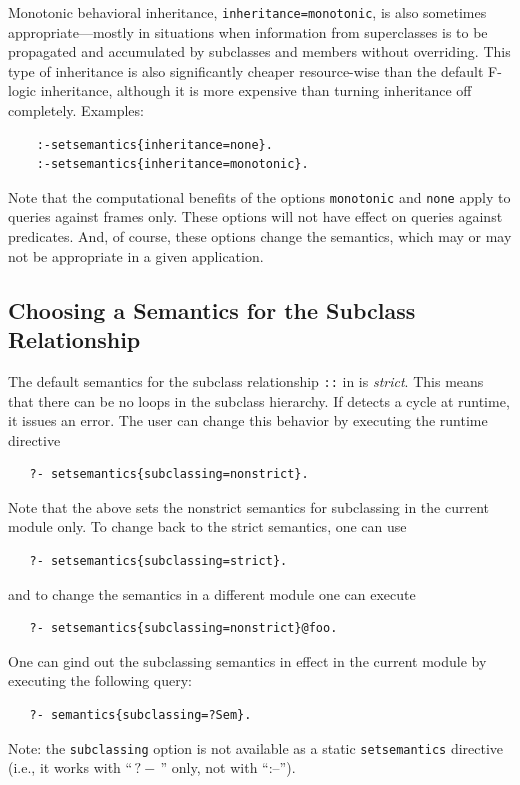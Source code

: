 \documentclass[11pt]{article}
\newcommand{\ERGO}{\mbox{\smaller{\ensuremath{\cal{E}}\smaller{{\sc{RGO}}}}}\xspace}
\newcommand{\FLSYSTEM}{\ERGO}
\newcommand{\query}{\mbox{$\, ?\! - \, $}}                  %
\newcommand{\fl}{\mbox{F-logic}\xspace}
\begin{document}
Monotonic behavioral inheritance, \texttt{inheritance=monotonic}, is also sometimes
appropriate---mostly in situations when information from superclasses is to
be propagated and accumulated by subclasses and members without overriding.
This type of inheritance is also significantly cheaper resource-wise than
the default \fl inheritance, although it is more expensive than turning inheritance
off completely.
Examples:
\begin{verbatim}
    :-setsemantics{inheritance=none}.
    :-setsemantics{inheritance=monotonic}.
\end{verbatim}
Note that the computational benefits of the options \texttt{monotonic} and 
\texttt{none} apply to queries against frames only.
These options will not have effect on queries against predicates.
And, of course, these options change the semantics, which may or may not be
appropriate in a given application.


\subsection{Choosing a Semantics for the Subclass Relationship}

The default semantics for the subclass relationship \texttt{::} in
\FLSYSTEM is \emph{strict}. This means that there can be no loops in the
subclass hierarchy. If \FLSYSTEM detects a cycle at runtime, it issues an
error.  The user can change this behavior by executing the runtime directive
\begin{verbatim}
   ?- setsemantics{subclassing=nonstrict}.
\end{verbatim}
Note that the above sets the nonstrict semantics for subclassing in the
current module only. To change back to the strict semantics, one can use
\begin{verbatim}
   ?- setsemantics{subclassing=strict}.
\end{verbatim}
and to change the semantics in a different module one can execute
\begin{verbatim}
   ?- setsemantics{subclassing=nonstrict}@foo.
\end{verbatim}

One can gind out the subclassing semantics in effect in the current module
by executing the following query:
\begin{verbatim}
   ?- semantics{subclassing=?Sem}.
\end{verbatim}
Note: the \texttt{subclassing} option is not available as a static
\texttt{setsemantics} directive (i.e., it works with ``$\query$'' only,
not with ``:--'').
\end{document}

